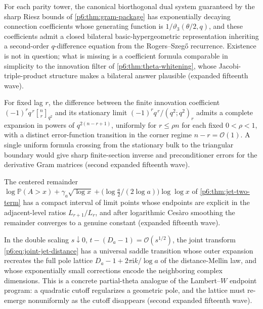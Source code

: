 \documentclass[11pt,oneside]{article}
\numberwithin{equation}{section}
\theoremstyle{definition}
\theoremstyle{remark}
\newcommand{\Prob}{\mathbb P}
\newcommand{\ii}{\mathrm i}
\newcommand{\bigO}{\mathcal O}
\newcommand{\qbinom}[3]{\genfrac{[}{]}{0pt}{}{#1}{#2}_{#3}}
\begin{document}
\begin{conjecture}
\label{p6:conj:dual-tower}
For each parity tower, the canonical biorthogonal dual system guaranteed
by the sharp Riesz bounds of \cref{p6:thm:gram-package} has exponentially
decaying connection coefficients whose generating function is
$1/\vartheta_3(\theta/2,q)$, and these coefficients admit a closed
bilateral basic-hypergeometric representation inheriting a second-order
$q$-difference equation from the Rogers--Szeg\H{o} recurrence.  Existence
is not in question; what is missing is a coefficient formula comparable in
simplicity to the innovation filter of \cref{p6:thm:theta-whitening},
whose Jacobi-triple-product structure makes a bilateral answer plausible
(expanded fifteenth wave).
\end{conjecture}

\begin{conjecture}
\label{p6:conj:finite-section}
For fixed lag $r$, the difference between the finite innovation
coefficient $(-1)^rq^{\,r}\qbinom{n}{r}{q^2}$ and its stationary limit
$(-1)^rq^{\,r}/(q^2;q^2)_r$ admits a complete expansion in powers of
$q^{2(n-r+1)}$, uniformly for $r\le\rho n$ for each fixed $0<\rho<1$,
with a distinct error-function transition in the corner regime
$n-r=\bigO(1)$.  A single uniform formula crossing from the stationary
bulk to the triangular boundary would give sharp finite-section inverse
and preconditioner errors for the derivative Gram matrices (second
expanded fifteenth wave).
\end{conjecture}

\begin{conjecture}
\label{p6:conj:jet-staircase-limit}
The centered remainder
$\log\Prob(A>x)+\gamma_a\sqrt{\log x}
+\bigl(\log\tfrac a2/(2\log a)\bigr)\log\log x$ of
\cref{p6:thm:jet-two-term} has a compact interval of limit points whose
endpoints are explicit in the adjacent-level ratios $L_{r+1}/L_r$, and
after logarithmic Ces\`aro smoothing the remainder converges to a genuine
constant (expanded fifteenth wave).
\end{conjecture}

\begin{conjecture}
\label{p6:conj:ptheta-poles}
In the double scaling $s\downarrow0$,
$t-(D_a-1)=\bigO(s^{1/2})$, the joint transform
\eqref{p6:eq:joint-jet-distance} has a universal saddle transition whose
outer expansion recreates the full pole lattice $D_a-1+2\pi\ii k/\log a$
of the distance-Mellin law, and whose exponentially small corrections
encode the neighboring complex dimensions.  This is a concrete
partial-theta analogue of the Lambert--$W$ endpoint program: a quadratic
cutoff regularizes a geometric pole, and the lattice must re-emerge
nonuniformly as the cutoff disappears (second expanded fifteenth wave).
\end{conjecture}
\end{document}
